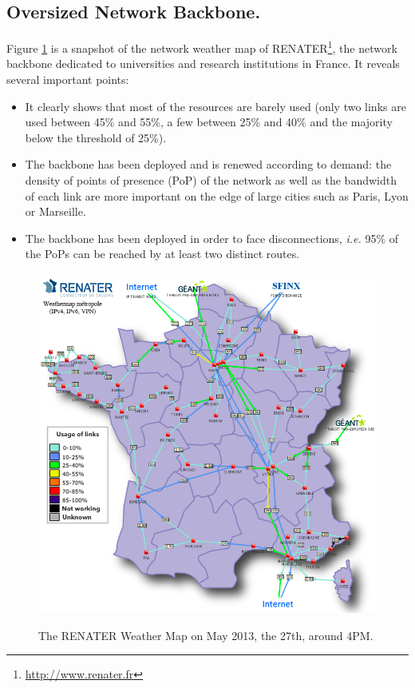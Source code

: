 \subsection{Oversized Network Backbone.}
Figure \ref{fig:renater} is a snapshot of the network weather
map of RENATER\footnote{\href{http://www.renater.fr}{http://www.renater.fr}}, the network backbone dedicated to universities and research
institutions in France. It reveals several important points: 
\begin{itemize} 
\item It clearly shows that most of the resources are barely used (only two links are used between 45\% and 55\%, a few between 25\% and 40\% and the majority below the threshold of 25\%). 
\item The backbone has been deployed and is renewed according to demand: the density of
points of presence (PoP) of the network as well as the bandwidth of each link are more important on the edge of large cities such as Paris, Lyon or
Marseille. 
\item The backbone has been deployed in order to face disconnections, \textit{i.e.} 95\% of the PoPs can be reached by at least two distinct routes.
\end{itemize}


\begin{figure}[b]
\includegraphics[width=12cm]{./FIGS/renater.png}
\vspace*{-.3cm}
\label{fig:renater}
\caption{The RENATER Weather Map on May 2013, the 27th, around 4PM.}
\vspace*{-.3cm}
\end{figure}

